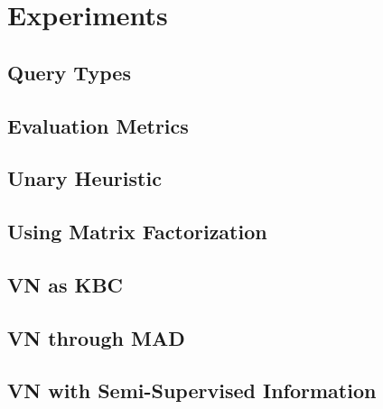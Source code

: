 \documentclass[paper=a4,fontsize=11pt]{scrartcl}
\numberwithin{equation}{section}    %
\numberwithin{figure}{section}      %
\numberwithin{table}{section}       %
\begin{document}
\section{Experiments}
\label{sec:experiments}


\subsection{Query Types}
\label{sec:query-types}

\subsection{Evaluation Metrics}
\label{sec:evaluation-metrics}

\subsection{Unary Heuristic}
\label{sec:unary_heuristic}

\subsection{Using Matrix Factorization}
\label{sec:using-matr-fact}

\subsection{VN as KBC}
\label{sec:vn-as-kbc}

\subsection{VN through MAD}
\label{sec:vn-through-mad}

\subsection{VN with Semi-Supervised Information}
\label{sec:vn-with-semi}




\end{document}

